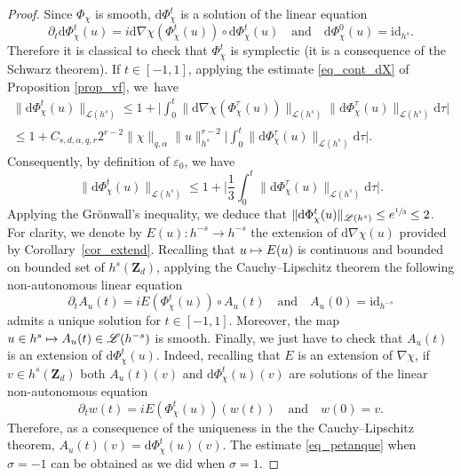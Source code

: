 \documentclass[JEP,XML,SOM,Unicode,NoEqCountersInSection,published]{cedram}
\newcommand\mto{\mathchoice{\longmapsto}{\mapsto}{\mapsto}{\mapsto}}
\theoremstyle{definition}
\begin{document}
\begin{proof}
Since $\Phi_\chi$ is smooth, $\mathrm{d}\Phi_\chi^t$ is a solution of the linear equation
\begin{equation}
\label{eq_lin}
\partial_t \mathrm{d}\Phi_\chi^t(u) = i \mathrm{d}\nabla \chi(\Phi_\chi^t(u))\circ \mathrm{d}\Phi_\chi^t(u) \quad \text{and} \quad \mathrm{d}\Phi_\chi^0(u) = \mathrm{id}_{h^s}.
\end{equation}
Therefore it is classical to check that $\Phi_\chi^t$ is symplectic (it is a consequence of the Schwarz theorem). If $t\in [-1,1]$, applying the estimate \eqref{eq_cont_dX} of Proposition \ref{prop_vf}, we~have
\begin{multline*}
\| \mathrm{d}\Phi_\chi^t(u) \|_{\mathscr{L}(h^s)} \leq 1+ \biggl| \int_0^t \| \mathrm{d}\nabla \chi(\Phi_\chi^\tau(u)) \|_{\mathscr{L}(h^s)} \| \mathrm{d}\Phi_\chi^\tau(u) \|_{\mathscr{L}(h^s)} \mathrm{d}\tau \biggr| \\ \leq 1+ C_{s,d,\alpha,q,r} 2^{r-2} \|\chi \|_{q,\alpha} \|u\|_{h^s}^{r-2}\biggl| \int_0^t \| \mathrm{d}\Phi_\chi^\tau(u) \|_{\mathscr{L}(h^s)} \mathrm{d}\tau \biggr|.
\end{multline*}
Consequently, by definition of $\varepsilon_0$, we have
\[
\| \mathrm{d}\Phi_\chi^t(u) \|_{\mathscr{L}(h^s)} \leq 1+\biggl| \frac13 \int_0^t \| \mathrm{d}\Phi_\chi^\tau(u) \|_{\mathscr{L}(h^s)} \mathrm{d}\tau \biggr|.
\]
Applying the Grönwall's inequality, we deduce that
$\| \mathrm{d}\Phi_\chi^t(u) \|_{\mathscr{L}(h^s)} \leq e^{\sfrac13} \leq 2$.
For clarity, we denote by $E(u):h^{-s}\to h^{-s}$ the extension of $\mathrm{d}\nabla \chi(u)$ provided by Corollary~\ref{cor_extend}. Recalling that $u\mto E(u)$ is continuous and bounded on bounded set of $h^s(\mathbf{Z}_d)$, applying the Cauchy--Lipschitz theorem the following non-autonomous linear equation
\begin{equation*}
\partial_t A_u(t) = iE(\Phi_\chi^t(u))\circ A_u(t) \quad \text{and} \quad A_u(0) = \mathrm{id}_{h^{-s}}
\end{equation*}
admits a unique solution for $t\in [-1,1]$. Moreover, the map $u\in h^s \mto A_u(t) \in \mathscr{L}(h^{-s})$ is smooth. Finally, we just have to check that $A_u(t)$ is an extension of $\mathrm{d}\Phi_\chi^t(u)$. Indeed, recalling that $E$ is an extension of $\nabla \chi$, if $v\in h^s(\mathbf{Z}_d)$ both $A_u(t)(v)$ and $\mathrm{d}\Phi_\chi^t(u)(v)$ are solutions of the linear non-autonomous equation
\[
\partial_t w(t) = i E(\Phi_\chi^t(u))(w(t)) \quad \text{and} \quad w(0) = v.
\]
Therefore, as a consequence of the uniqueness in the the Cauchy--Lipschitz theorem, $A_u(t)(v) =\mathrm{d}\Phi_\chi^t(u)(v)$. The estimate \eqref{eq_petanque} when $\sigma=-1$ can be obtained as we did when $\sigma=1$.
\end{proof}
\end{document}
